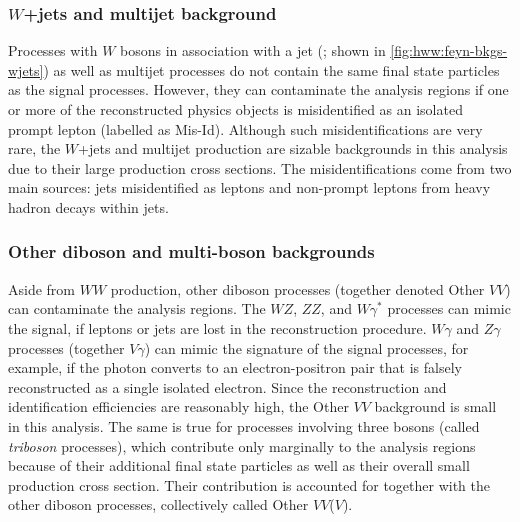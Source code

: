 \subsubsection{$W$+jets and multijet background}
Processes with $W$ bosons in association with a jet (\Wjets; shown in \cref{fig:hww:feyn-bkgs-wjets}) as well as multijet processes do not contain the same final state particles as the signal processes. However, they can contaminate the analysis regions if one or more of the reconstructed physics objects is misidentified as an isolated prompt lepton (labelled as Mis-Id). 
Although such misidentifications are very rare, the $W$+jets and multijet production are sizable backgrounds in this analysis due to their large production cross sections.
The misidentifications come from two main sources: jets misidentified as leptons and non-prompt leptons from heavy hadron decays within jets. 

\subsubsection{Other diboson and multi-boson backgrounds}
Aside from $WW$ production, other diboson processes (together denoted Other $VV$) can contaminate the analysis regions. 
The $WZ$, $ZZ$, and $W\gamma^*$ processes can mimic the signal, if leptons or jets are lost in the reconstruction procedure. 
$W\gamma$ and $Z\gamma$ processes (together $V\gamma$) can mimic the signature of the signal processes, for example, if the photon converts to an electron-positron pair that is falsely reconstructed as a single isolated electron. 
Since the reconstruction and identification efficiencies are reasonably high, the Other $VV$ background is small in this analysis.
The same is true for processes involving three bosons (called \emph{triboson} processes), which contribute only marginally to the analysis regions because of their additional final state particles as well as their overall small production cross section. Their contribution is accounted for together with the other diboson processes, collectively called Other $VV$($V$). 

